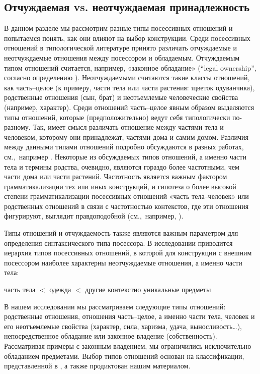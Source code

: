 \subsection{Отчуждаемая vs. неотчуждаемая принадлежность}

В данном разделе мы рассмотрим разные типы посессивных отношений и попытаемся понять, как они влияют на выбор конструкции. Среди посессивных отношений в типологической литературе принято различать отчуждаемые и неотчуждаемые отношения между посессором и обладаемым. Отчуждаемым типом отношений считается, например, «законное обладание» (“legal ownership”, согласно определению \parencite{aikhenvald2019}). Неотчуждаемыми считаются такие классы отношений, как часть–целое (к примеру, части тела или части растения: \i{цветок одуванчика}), родственные отношения (сын, брат) и неотъемлемые человеческие свойства (например, характер). Среди отношений часть–целое явным образом выделяются типы отношений, которые (предположительно) ведут себя типологически по-разному. Так, имеет смысл различать отношение между частями тела и человеком, которому они принадлежат, частями дома и самим домом. Различия между данными типами отношений подробно обсуждаются в разных работах, см.,~например \parencites{aikhenvald2019}{dahl_koptjevskaja_tamm2001}. Некоторые из обсуждаемых типов отношений, а именно части тела и термины родства, очевидно, являются гораздо более частотными, чем части дома или части растений. Частотность является важным фактором грамматикализации тех или иных конструкций, и гипотеза о более высокой степени грамматикализации посессивных отношений «часть тела–человек» или родственных отношений в связи с частотностью контекстов, где эти отношения фигурируют, выглядит правдоподобной (см.,~например, \parencite{haspelmath2008}).

Типы отношений и отчуждаемость также являются важным параметром для определения синтаксического типа посессора. В исследовании \parencite{koenig_haspelmath1997} приводится иерархия типов посессивных отношений, в которой для конструкции с внешним посессором наиболее характерны неотчуждаемые отношения, а именно части тела:

часть тела $<$ одежда $<$ другие контекстно уникальные предметы
\xe

В нашем исследовании мы рассматриваем следующие типы отношений: родственные отношения, отношения часть–целое, а именно части тела, человек и его неотъемлемые свойства (характер, сила, харизма, удача, выносливость…), непосредственное обладание или законное владение (собственность). Рассматривая примеры с законным владением, мы ограничились исключительно обладанием предметами. Выбор типов отношений основан на классификации, представленной в \parencite{aikhenvald2019}, а также продиктован нашим материалом.

